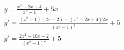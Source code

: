 \begin{ex}
\begin{align}
&y=\frac{x^2-2x+4}{x^2-1}+5x\nonumber\\
&y'=\frac{(x^2-1)(2x-2)-(x^2-2x+4)2x}{(x^2-1)^2}+5\nonumber\\
&y'=\frac{2x^2-10x+2}{(x^2-1)^2}+5\nonumber
\end{align}
\end{ex}